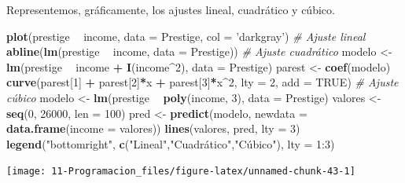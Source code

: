 \documentclass[]{book}
\newenvironment{Shaded}{\begin{snugshade}}{\end{snugshade}}
\newcommand{\KeywordTok}[1]{\textcolor[rgb]{0.13,0.29,0.53}{\textbf{#1}}}
\newcommand{\DataTypeTok}[1]{\textcolor[rgb]{0.13,0.29,0.53}{#1}}
\newcommand{\DecValTok}[1]{\textcolor[rgb]{0.00,0.00,0.81}{#1}}
\newcommand{\StringTok}[1]{\textcolor[rgb]{0.31,0.60,0.02}{#1}}
\newcommand{\CommentTok}[1]{\textcolor[rgb]{0.56,0.35,0.01}{\textit{#1}}}
\newcommand{\OtherTok}[1]{\textcolor[rgb]{0.56,0.35,0.01}{#1}}
\newcommand{\OperatorTok}[1]{\textcolor[rgb]{0.81,0.36,0.00}{\textbf{#1}}}
\newcommand{\NormalTok}[1]{#1}
\begin{document}
Representemos, gráficamente, los ajustes lineal, cuadrático y cúbico.

\begin{Shaded}
\begin{Highlighting}[]
\KeywordTok{plot}\NormalTok{(prestige }\OperatorTok{~}\StringTok{ }\NormalTok{income, }\DataTypeTok{data =}\NormalTok{ Prestige, }\DataTypeTok{col =} \StringTok{'darkgray'}\NormalTok{)}
\CommentTok{# Ajuste lineal}
\KeywordTok{abline}\NormalTok{(}\KeywordTok{lm}\NormalTok{(prestige }\OperatorTok{~}\StringTok{ }\NormalTok{income, }\DataTypeTok{data =}\NormalTok{ Prestige))}
\CommentTok{# Ajuste cuadrático}
\NormalTok{modelo <-}\StringTok{ }\KeywordTok{lm}\NormalTok{(prestige }\OperatorTok{~}\StringTok{ }\NormalTok{income }\OperatorTok{+}\StringTok{ }\KeywordTok{I}\NormalTok{(income}\OperatorTok{^}\DecValTok{2}\NormalTok{), }\DataTypeTok{data =}\NormalTok{ Prestige)}
\NormalTok{parest <-}\StringTok{ }\KeywordTok{coef}\NormalTok{(modelo)}
\KeywordTok{curve}\NormalTok{(parest[}\DecValTok{1}\NormalTok{] }\OperatorTok{+}\StringTok{ }\NormalTok{parest[}\DecValTok{2}\NormalTok{]}\OperatorTok{*}\NormalTok{x }\OperatorTok{+}\StringTok{ }\NormalTok{parest[}\DecValTok{3}\NormalTok{]}\OperatorTok{*}\NormalTok{x}\OperatorTok{^}\DecValTok{2}\NormalTok{, }\DataTypeTok{lty =} \DecValTok{2}\NormalTok{, }\DataTypeTok{add =} \OtherTok{TRUE}\NormalTok{)}
\CommentTok{# Ajuste cúbico}
\NormalTok{modelo <-}\StringTok{ }\KeywordTok{lm}\NormalTok{(prestige }\OperatorTok{~}\StringTok{ }\KeywordTok{poly}\NormalTok{(income, }\DecValTok{3}\NormalTok{), }\DataTypeTok{data =}\NormalTok{ Prestige)}
\NormalTok{valores <-}\StringTok{ }\KeywordTok{seq}\NormalTok{(}\DecValTok{0}\NormalTok{, }\DecValTok{26000}\NormalTok{, }\DataTypeTok{len =} \DecValTok{100}\NormalTok{)}
\NormalTok{pred <-}\StringTok{ }\KeywordTok{predict}\NormalTok{(modelo, }\DataTypeTok{newdata =} \KeywordTok{data.frame}\NormalTok{(}\DataTypeTok{income =}\NormalTok{ valores))}
\KeywordTok{lines}\NormalTok{(valores, pred, }\DataTypeTok{lty =} \DecValTok{3}\NormalTok{)}
\KeywordTok{legend}\NormalTok{(}\StringTok{"bottomright"}\NormalTok{, }\KeywordTok{c}\NormalTok{(}\StringTok{"Lineal"}\NormalTok{,}\StringTok{"Cuadrático"}\NormalTok{,}\StringTok{"Cúbico"), lty = 1:3)}
\end{Highlighting}
\end{Shaded}

\begin{center}\texttt{[image: 11-Programacion\_files/figure-latex/unnamed-chunk-43-1]} \end{center}
\end{document}
